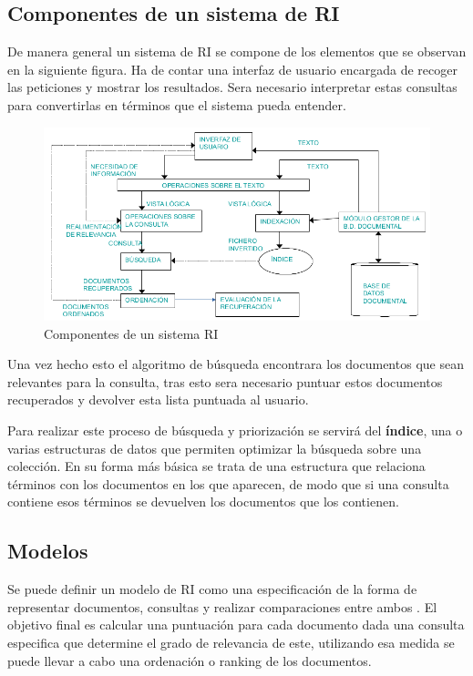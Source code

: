 \subsection{Componentes de un sistema de \acrshort{RI}}
De manera general un sistema de \acrshort{RI} se compone de los elementos que se observan en la siguiente figura. Ha de contar una interfaz de usuario encargada de recoger las peticiones y mostrar los resultados. Sera necesario interpretar estas consultas para convertirlas en términos que el sistema pueda entender.

\begin{figure}[h]
	\centering
	\includegraphics[width=\linewidth]{imagenes/componentes_ri}
	\caption{Componentes de un sistema RI \cite{ApuntesRI}}
	\label{fig:componentes RI}
\end{figure}

Una vez hecho esto el algoritmo de búsqueda encontrara los documentos que sean relevantes para la consulta, tras esto sera necesario puntuar estos documentos recuperados y devolver esta lista puntuada al usuario.

Para realizar este proceso de búsqueda y priorización se servirá del \textbf{índice}, una o varias estructuras de datos que permiten optimizar la búsqueda sobre una colección. En su forma más básica se trata de una estructura que relaciona términos con los documentos en los que aparecen, de modo que si una consulta contiene esos términos se devuelven los documentos que los contienen.

\subsection{Modelos}
\label{subsc:modelos}
Se puede definir un modelo de \acrshort{RI} como una especificación de la forma de representar documentos, consultas y realizar comparaciones entre ambos \cite{ApuntesRI}. El objetivo final es calcular una puntuación para cada documento dada una consulta especifica que determine el grado de relevancia de este, utilizando esa medida se puede llevar a cabo una ordenación o ranking de los documentos. 

